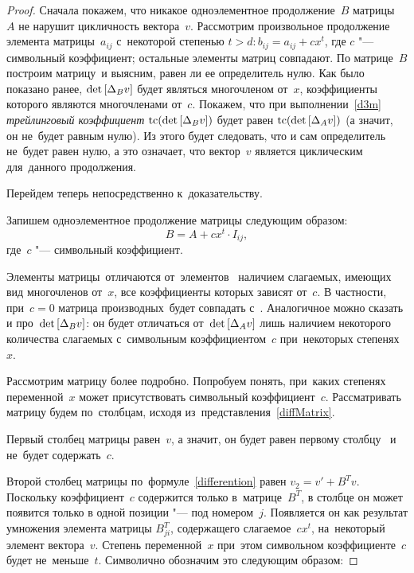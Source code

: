 \begin{proof}

Сначала покажем, что никакое одноэлементное продолжение~$B$ матрицы~$A$ не нарушит цикличность вектора~$v$.
Рассмотрим произвольное продолжение элемента матрицы~$a_{ij}$ с~некоторой степенью $t > d: b_{ij} = a_{ij} + cx^t$,
где $c$ "--- символьный коэффициент; остальные элементы матриц совпадают.
По матрице~$B$ построим матрицу~\diffMatrix[B] и выясним, равен ли ее определитель нулю.
Как было показано ранее, $\mathop{\rm det} \text{$ [\Delta_B v] $}$ будет являться многочленом от~$x$, коэффициенты которого являются многочленами от~$c$.
Покажем, что при выполнении~\eqref{d3m} \textit{трейлинговый коэффициент} $\mathop{\rm tc} (\mathop{\rm det} \text{$ [\Delta_B v] $})$ будет равен $\mathop{\rm tc} (\mathop{\rm det} \text{$ [\Delta_A v] $})$
(а значит, он не~будет равным нулю).
Из этого будет следовать, что и сам определитель не~будет равен нулю, а это означает,
что вектор~$v$ является циклическим для~данного продолжения.
\medskip

\newpage
Перейдем теперь непосредственно к~доказательству.

Запишем одноэлементное продолжение матрицы следующим образом:
\begin{equation}
	B = A + cx^t \cdot I_{ij},
\end{equation}
где~$c$ "--- символьный коэффициент.

Элементы матрицы~\diffMatrix[B] отличаются от~элементов \diffMatrix\ наличием слагаемых, имеющих вид многочленов от~$x$, все коэффициенты которых зависят от~$c$.
В частности, при~$c = 0$ матрица производных~\diffMatrix[B] будет совпадать с~\diffMatrix.
Аналогичное можно сказать и про~$\mathop{\rm det} \text{$ [\Delta_B v] $}$: он будет отличаться от~$\mathop{\rm det} \text{$ [\Delta_A v] $}$ 
лишь наличием некоторого количества слагаемых с~символьным коэффициентом~$c$ при~некоторых степенях~$x$.
\medskip

Рассмотрим матрицу \diffMatrix[B] более подробно.
Попробуем понять, при~каких степенях переменной~$x$ может присутствовать символьный коэффициент~$c$.
Рассматривать матрицу будем по~столбцам, исходя из~представления~\eqref{diffMatrix}.

Первый столбец матрицы \diffMatrix[B] равен~$v$, а значит, он будет равен первому столбцу \diffMatrix\ и не~будет содержать~$c$.

Второй столбец матрицы \diffMatrix[B] по~формуле~\eqref{differention} равен $v_2 = v' + {B}^Tv$.
Поскольку коэффициент~$c$ 
содержится только в~матрице~${B}^T$, в столбце он может появится только в одной позиции "--- под номером~$j$.
Появляется он как результат умножения элемента матрицы $B^{T}_{ji}$,
содержащего слагаемое~$cx^t$, на~некоторый элемент вектора~$v$.
Степень переменной~$x$ при~этом символьном коэффициенте~$c$
будет не~меньше~$t$. Символично обозначим это следующим образом:


\end{proof}
